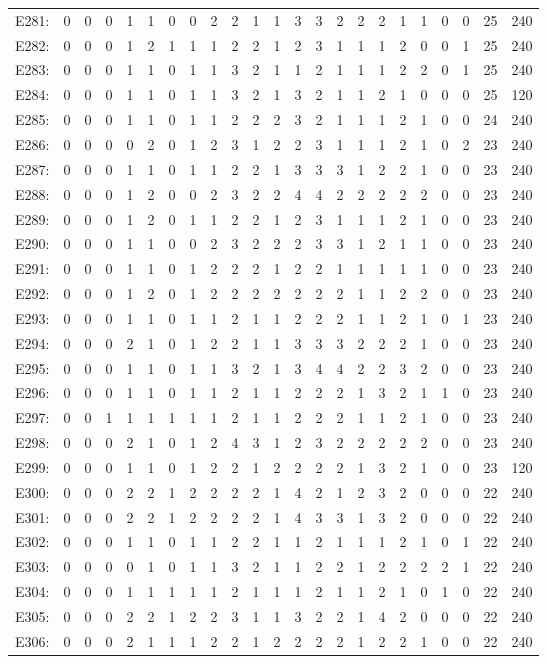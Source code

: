 \documentclass[12pt]{article}
\begin{document}
\begin{center}
\scriptsize
\begin{tabular}{ccccccccccccccccccccc|c|c}
E281:&0&0&0&1&1&0&0&2&2&1&1&3&3&2&2&2&1&1&0&0&25&240\\
E282:&0&0&0&1&2&1&1&1&2&2&1&2&3&1&1&1&2&0&0&1&25&240\\
E283:&0&0&0&1&1&0&1&1&3&2&1&1&2&1&1&1&2&2&0&1&25&240\\
E284:&0&0&0&1&1&0&1&1&3&2&1&3&2&1&1&2&1&0&0&0&25&120\\
E285:&0&0&0&1&1&0&1&1&2&2&2&3&2&1&1&1&2&1&0&0&24&240\\
E286:&0&0&0&0&2&0&1&2&3&1&2&2&3&1&1&1&2&1&0&2&23&240\\
E287:&0&0&0&1&1&0&1&1&2&2&1&3&3&3&1&2&2&1&0&0&23&240\\
E288:&0&0&0&1&2&0&0&2&3&2&2&4&4&2&2&2&2&2&0&0&23&240\\
E289:&0&0&0&1&2&0&1&1&2&2&1&2&3&1&1&1&2&1&0&0&23&240\\
E290:&0&0&0&1&1&0&0&2&3&2&2&2&3&3&1&2&1&1&0&0&23&240\\
E291:&0&0&0&1&1&0&1&2&2&2&1&2&2&1&1&1&1&1&0&0&23&240\\
E292:&0&0&0&1&2&0&1&2&2&2&2&2&2&2&1&1&2&2&0&0&23&240\\
E293:&0&0&0&1&1&0&1&1&2&1&1&2&2&2&1&1&2&1&0&1&23&240\\
E294:&0&0&0&2&1&0&1&2&2&1&1&3&3&3&2&2&2&1&0&0&23&240\\
E295:&0&0&0&1&1&0&1&1&3&2&1&3&4&4&2&2&3&2&0&0&23&240\\
E296:&0&0&0&1&1&0&1&1&2&1&1&2&2&2&1&3&2&1&1&0&23&240\\
E297:&0&0&1&1&1&1&1&1&2&1&1&2&2&2&1&1&2&1&0&0&23&240\\
E298:&0&0&0&2&1&0&1&2&4&3&1&2&3&2&2&2&2&2&0&0&23&240\\
E299:&0&0&0&1&1&0&1&2&2&1&2&2&2&2&1&3&2&1&0&0&23&120\\
E300:&0&0&0&2&2&1&2&2&2&2&1&4&2&1&2&3&2&0&0&0&22&240\\
E301:&0&0&0&2&2&1&2&2&2&2&1&4&3&3&1&3&2&0&0&0&22&240\\
E302:&0&0&0&1&1&0&1&1&2&2&1&1&2&1&1&1&2&1&0&1&22&240\\
E303:&0&0&0&0&1&0&1&1&3&2&1&1&2&2&1&2&2&2&2&1&22&240\\
E304:&0&0&0&1&1&1&1&1&2&1&1&1&2&1&1&2&1&0&1&0&22&240\\
E305:&0&0&0&2&2&1&2&2&3&1&1&3&2&2&1&4&2&0&0&0&22&240\\
E306:&0&0&0&2&1&1&1&2&2&1&2&2&2&2&1&2&2&1&0&0&22&240\\

\end{tabular}
\end{center}
\end{document}

